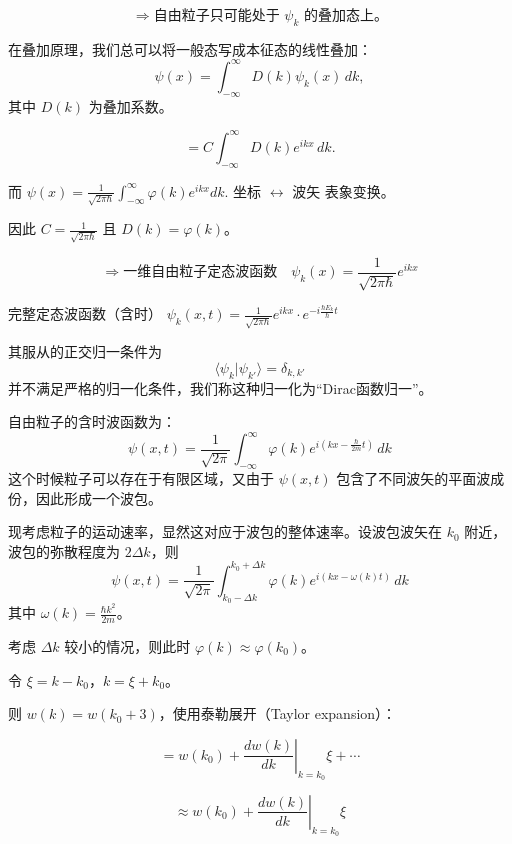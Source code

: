 \documentclass[lang=cn,10pt]{elegantbook}
\begin{document}
\[
\Rightarrow \text{自由粒子只可能处于 } \psi_k \text{ 的叠加态上。}
\]

在叠加原理，我们总可以将一般态写成本征态的线性叠加：
\[
\psi(x) = \int_{-\infty}^{\infty} D(k) \psi_k(x) \, dk,
\]
其中 $D(k)$ 为叠加系数。

\[
= C \int_{-\infty}^{\infty} D(k) e^{ikx} \, dk.
\]

而 $\psi(x) = \frac{1}{\sqrt{2\pi\hbar}} \int_{-\infty}^{\infty} \varphi(k) e^{ikx} dk$. 坐标 $\leftrightarrow$ 波矢 表象变换。

因此 $C = \frac{1}{\sqrt{2\pi\hbar}}$ 且 $D(k) = \varphi(k)$。

\[
\Rightarrow \text{一维自由粒子定态波函数} \quad \psi_k(x) = \frac{1}{\sqrt{2\pi\hbar}} e^{ikx}
\]

完整定态波函数（含时） $\psi_k(x,t) = \frac{1}{\sqrt{2\pi\hbar}} e^{ikx} \cdot e^{-i\frac{\hbar E_k}{\hbar}t}$

其服从的正交归一条件为
\[
\langle \psi_k | \psi_{k'} \rangle = \delta_{k,k'}
\]
并不满足严格的归一化条件，我们称这种归一化为“Dirac函数归一”。

自由粒子的含时波函数为：
\[
\psi(x,t) = \frac{1}{\sqrt{2\pi}} \int_{-\infty}^{\infty} \varphi(k) e^{i(kx - \frac{\hbar}{2m}t)} \, dk
\]
这个时候粒子可以存在于有限区域，又由于 $\psi(x,t)$ 包含了不同波矢的平面波成份，因此形成一个波包。

现考虑粒子的运动速率，显然这对应于波包的整体速率。设波包波矢在 $k_0$ 附近，波包的弥散程度为 $2\Delta k$，则
\[
\psi(x,t) = \frac{1}{\sqrt{2\pi}} \int_{k_0 - \Delta k}^{k_0 + \Delta k} \varphi(k) e^{i(kx - \omega(k)t)} \, dk
\]
其中 $\omega(k) = \frac{\hbar k^2}{2m}$。

考虑 $\Delta k$ 较小的情况，则此时 $\varphi(k) \approx \varphi(k_0)$。

令 $\xi = k - k_0$，$k = \xi + k_0$。

则 $w(k) = w(k_0 + 3)$，使用泰勒展开（Taylor expansion）：

\[
= w(k_0) + \left. \frac{dw(k)}{dk} \right|_{k=k_0} \xi + \cdots
\]

\[
\approx w(k_0) + \left. \frac{dw(k)}{dk} \right|_{k=k_0} \xi
\]
\end{document}
